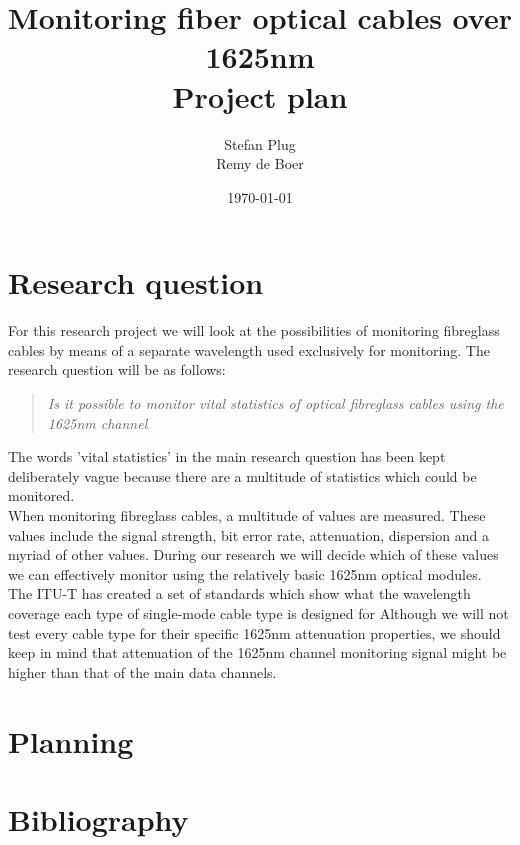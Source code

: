 \documentclass{article}
\begin{document}
\title{Monitoring fiber optical cables over 1625nm\\Project plan}
\author{Stefan Plug\\Remy de Boer}
\date{\today}
\maketitle

\section{Research question}
For this research project we will look at the possibilities of monitoring fibreglass cables by means of a separate wavelength used exclusively for monitoring.
The research question will be as follows:
\begin{quote}
\textit{
Is it possible to monitor vital statistics of optical fibreglass cables using the 1625nm channel
}
\end{quote}

The words 'vital statistics' in the main research question has been kept deliberately vague because there are a multitude of statistics which could be monitored.\\
When monitoring fibreglass cables, a multitude of values are measured.
These values include the signal strength, bit error rate, attenuation, dispersion and a myriad of other values.
During our research we will decide which of these values we can effectively monitor using the relatively basic 1625nm optical modules.\\

The ITU-T has created a set of standards which show what the wavelength coverage each type of single-mode cable type is designed for \cite[p.~21]{refguide:2011} 
Although we will not test every cable type for their specific 1625nm attenuation properties, we should keep in mind that attenuation of the 1625nm channel monitoring signal might be higher than that of the main data channels.





\section{Planning}

\section{Bibliography}


\end{document}
